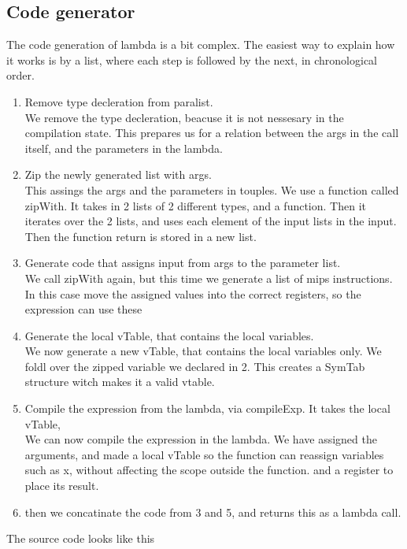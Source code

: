 \documentclass[11pt]{article}
\begin{document}
\subsection{Code generator}
The code generation of lambda is a bit complex. The easiest way to explain how it works
is by a list, where each step is followed by the next, in chronological order.
\begin{enumerate}
  \item Remove type decleration from paralist.\\
  We remove the type decleration, beacuse it is not nessesary in the compilation state. This
  prepares us for a relation between the args in the call itself, and the parameters in the
  lambda.
  \item Zip the newly generated list with args.\\
  This assings the args and the parameters in touples. We use a function called zipWith.
  It takes in 2 lists of 2 different types, and a function. Then it iterates over the 2 lists,
  and uses each element of the input lists in the input. Then the function return is stored in
  a new list.
  \item Generate code that assigns input from args to the parameter list.\\
  We call zipWith again, but this time we generate a list of mips instructions. In this case
  move the assigned values into the correct registers, so the expression can use these
  \item Generate the local vTable, that contains the local variables.\\
  We now generate a new vTable, that contains the local variables only. We foldl over the zipped
  variable we declared in 2. This creates a SymTab structure witch makes it a valid vtable.
  \item Compile the expression from the lambda, via compileExp. It takes the local vTable,\\
  We can now compile the expression in the lambda. We have assigned the arguments, and made a
  local vTable so the function can reassign variables such as x, without affecting the scope
  outside the function.
  and a register to place its result.
  \item then we concatinate the code from 3 and 5, and returns this as a lambda call.
\end{enumerate}
The source code looks like this
\end{document}
